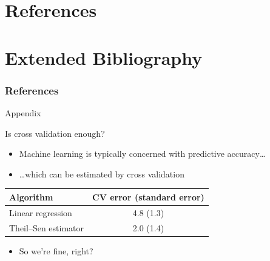 {
\section{References}
\section{Extended Bibliography}
\tiny
\begin{frame}
  \frametitle{References}
  
  
\end{frame}
}

\begin{frame}{Appendix}
\end{frame}

\begin{frame}{Is cross validation enough?}
  \begin{itemize}
    \item Machine learning is typically concerned with predictive accuracy\dots
    \vspace{\baselineskip}
    \pause
    \item \dots which can be estimated by cross validation
  \end{itemize}
  \begin{center}
    \begin{tabular}{|l|c|}
      \hline
      Algorithm & CV error (standard error) \\
      \hline
      Linear regression & 4.8 (1.3) \\
      Theil--Sen estimator & 2.0 (1.4) \\
      \hline
    \end{tabular}
  \end{center}
  \pause
  \begin{itemize}
    \item So we're fine, right?
  \end{itemize}
\end{frame}

